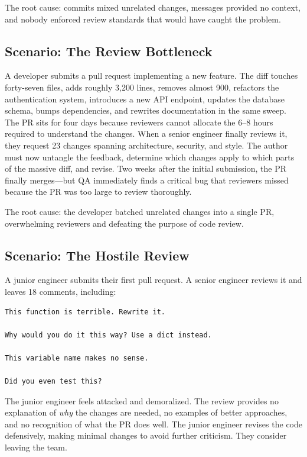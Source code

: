 The root cause: commits mixed unrelated changes, messages provided no context, and nobody enforced review standards that would have caught the problem.

\subsection{Scenario: The Review Bottleneck}
A developer submits a pull request implementing a new feature. The diff touches forty-seven files, adds roughly 3,200 lines, removes almost 900, refactors the authentication system, introduces a new API endpoint, updates the database schema, bumps dependencies, and rewrites documentation in the same sweep. The PR sits for four days because reviewers cannot allocate the 6--8 hours required to understand the changes. When a senior engineer finally reviews it, they request 23 changes spanning architecture, security, and style. The author must now untangle the feedback, determine which changes apply to which parts of the massive diff, and revise. Two weeks after the initial submission, the PR finally merges---but QA immediately finds a critical bug that reviewers missed because the PR was too large to review thoroughly.

The root cause: the developer batched unrelated changes into a single PR, overwhelming reviewers and defeating the purpose of code review.

\subsection{Scenario: The Hostile Review}
A junior engineer submits their first pull request. A senior engineer reviews it and leaves 18 comments, including:

\begin{lstlisting}[style=markdown,caption={Adversarial review comments destroy psychological safety}]
This function is terrible. Rewrite it.

Why would you do it this way? Use a dict instead.

This variable name makes no sense.

Did you even test this?
\end{lstlisting}

The junior engineer feels attacked and demoralized. The review provides no explanation of \textit{why} the changes are needed, no examples of better approaches, and no recognition of what the PR does well. The junior engineer revises the code defensively, making minimal changes to avoid further criticism. They consider leaving the team.

